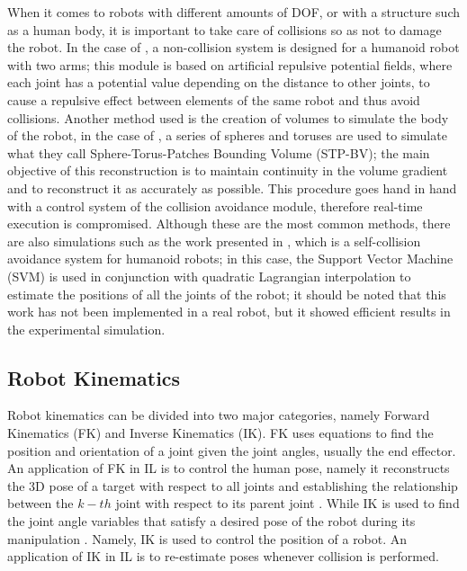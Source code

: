 \documentclass[thesis]{mas_proposal}
\begin{document}
    When it comes to robots with different amounts of DOF, or with a structure such as a human body, it is important to take care of collisions so as not to damage the robot. In the case of \cite{Dietrich2012, Santis2007}, a non-collision system is designed for a humanoid robot with two arms; this module is based on artificial repulsive potential fields, where each joint has a potential value depending on the distance to other joints, to cause a repulsive effect between elements of the same robot and thus avoid collisions. Another method used is the creation of volumes to simulate the body of the robot, in the case of \cite{Stasse2008}, a series of spheres and toruses are used to simulate what they call Sphere-Torus-Patches Bounding Volume (STP-BV); the main objective of this reconstruction is to maintain continuity in the volume gradient and to reconstruct it as accurately as possible. This procedure goes hand in hand with a control system of the collision avoidance module, therefore real-time execution is compromised. Although these are the most common methods, there are also simulations such as the work presented in \cite{Fang2015}, which is a self-collision avoidance system for humanoid robots; in this case, the Support Vector Machine (SVM) is used in conjunction with quadratic Lagrangian interpolation to estimate the positions of all the joints of the robot; it should be noted that this work has not been implemented in a real robot, but it showed efficient results in the experimental simulation.
    
    \subsection{Robot Kinematics}
    
    Robot kinematics can be divided into two major categories, namely Forward Kinematics (FK) and Inverse Kinematics (IK). FK uses equations to find the position and orientation of a joint given the joint angles, usually the end effector. An application of FK in IL is to control the human pose, namely it reconstructs the 3D pose of a target with respect to all joints and establishing the relationship between the $k-th$ joint with respect to its parent joint \cite{Li2021}. While IK is used to find the joint angle variables that satisfy a desired pose of the robot during its manipulation \cite{Hayat2015}. Namely, IK is used to control the position of a robot. An application of IK in IL is to re-estimate poses whenever collision is performed.
    
\end{document}
